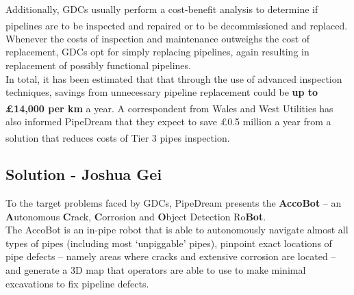 \documentclass[11pt]{article}		%
\newcommand{\supercite}[1]{\textsuperscript{\cite{#1}}}		%
\newcommand{\sectref}[1]{\hyperref[#1]{Section \ref*{#1}}}     %
\begin{document}
    Additionally, GDCs usually perform a cost-benefit analysis to determine if pipelines are to be inspected and repaired or to be decommissioned and replaced\supercite{CBA}. Whenever the costs of inspection and maintenance outweighs the cost of replacement, GDCs opt for simply replacing pipelines, again resulting in replacement of possibly functional pipelines. 
    \\
    \hspace*{3ex}In total, it has been estimated that that through the use of advanced inspection techniques, savings from unnecessary pipeline replacement could be \textbf{up to £14,000 per km} a year\supercite{GRAID}. A correspondent from Wales and West Utilities has also informed PipeDream that they expect to save £0.5 million a year from a solution that reduces costs of Tier 3 pipes inspection\supercite{WWU}. 

	\subsection[Solution]{Solution - Joshua Gei}
	
    To the target problems faced by GDCs, PipeDream presents the \textbf{AccoBot} – an \textbf{A}utonomous \textbf{C}rack, \textbf{C}orrosion and \textbf{O}bject Detection Ro\textbf{Bot}. \\
    \hspace*{3ex}The AccoBot is an in-pipe robot that is able to autonomously navigate almost all types of pipes (including most ‘unpiggable’ pipes), pinpoint exact locations of pipe defects – namely areas where cracks and extensive corrosion are located – and generate a 3D map that operators are able to use to make minimal excavations to fix pipeline defects. 
\end{document}
